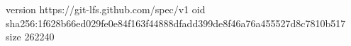 version https://git-lfs.github.com/spec/v1
oid sha256:1f628b66ed029fe0e84f163f44888dfadd399de8f46a76a455527d8c7810b517
size 262240
